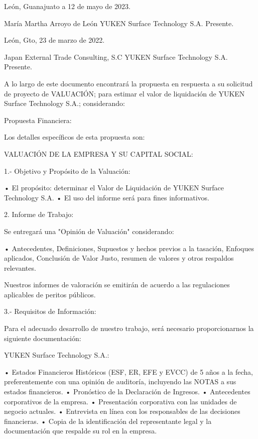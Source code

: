 \documentclass[5pt,letter]{report}
\begin{document}
\begin{minipage}{12cm}

León, Guanajuato a 12 de mayo de 2023.

María Martha Arroyo de León
YUKEN Surface Technology S.A.
Presente.

\end{minipage}

León, Gto, 23 de marzo de 2022.

Japan External Trade Consulting, S.C
YUKEN Surface Technology S.A.
Presente.

A lo largo de este documento encontrará la propuesta en respuesta a su solicitud de proyecto de VALUACIÓN; para estimar el valor de liquidación de YUKEN Surface Technology S.A.; considerando:

Propuesta Financiera:

Los detalles específicos de esta propuesta son:

VALUACIÓN DE LA EMPRESA Y SU CAPITAL SOCIAL:

1.- Objetivo y Propósito de la Valuación:

•	El propósito: determinar el Valor de Liquidación de YUKEN Surface Technology S.A.
•	El uso del informe será para fines informativos.

2. Informe de Trabajo:

Se entregará una "Opinión de Valuación" considerando:

•	Antecedentes, Definiciones, Supuestos y hechos previos a la tasación, Enfoques aplicados, Conclusión de Valor Justo, resumen de valores y otros respaldos relevantes.

Nuestros informes de valoración se emitirán de acuerdo a las regulaciones aplicables de peritos públicos.

3.- Requisitos de Información:

Para el adecuado desarrollo de nuestro trabajo, será necesario proporcionarnos la siguiente documentación:


YUKEN Surface Technology S.A.:

• Estados Financieros Históricos (ESF, ER, EFE y EVCC) de 5 años a la fecha, preferentemente con una opinión de auditoría, incluyendo las NOTAS a sus estados financieros.
• Pronóstico de la Declaración de Ingresos.
• Antecedentes corporativos de la empresa.
• Presentación corporativa con las unidades de negocio actuales.
• Entrevista en línea con los responsables de las decisiones financieras.
• Copia de la identificación del representante legal y la documentación que respalde su rol en la empresa.
\end{document}
